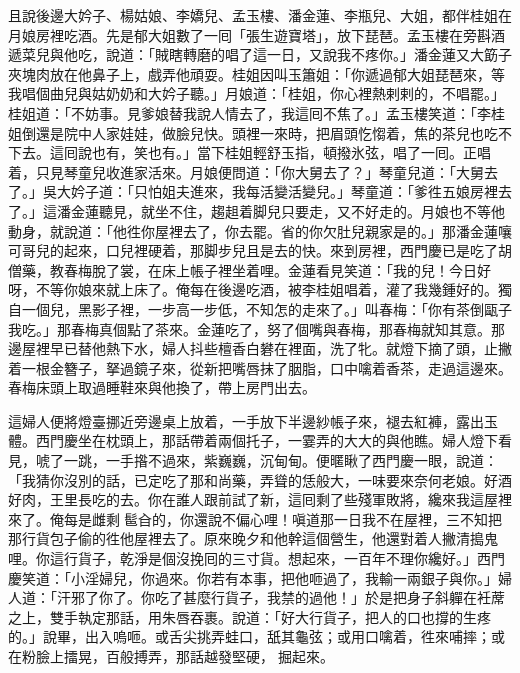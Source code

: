 且說後邊大妗子、楊姑娘、李嬌兒、孟玉樓、潘金蓮、李瓶兒、大姐，都伴桂姐在月娘房裡吃酒。先是郁大姐數了一囘「張生遊寶塔」，放下琵琶。孟玉樓在旁斟酒遞菜兒與他吃，說道：「賊瞎轉磨的唱了這一日，又說我不疼你。」潘金蓮又大筯子夾塊肉放在他鼻子上，戲弄他頑耍。桂姐因叫玉簫姐：「你遞過郁大姐琵琶來，等我唱個曲兒與姑奶奶和大妗子聽。」月娘道：「桂姐，你心裡熱剌剌的，不唱罷。」桂姐道：「不妨事。見爹娘替我說人情去了，我這囘不焦了。」孟玉樓笑道：「李桂姐倒還是院中人家娃娃，做臉兒快。頭裡一來時，把眉頭忔㥮着，焦的茶兒也吃不下去。{}這囘說也有，笑也有。」當下桂姐輕舒玉指，頓撥氷弦，唱了一囘。正唱着，只見琴童兒收進家活來。月娘便問道：「你大舅去了？」琴童兒道：「大舅去了。」吳大妗子道：「只怕姐夫進來，我每活變活變兒。」琴童道：「爹徃五娘房裡去了。」這潘金蓮聽見，就坐不住，趨趄着脚兒只要走，又不好走的。{}月娘也不等他動身，就說道：「他徃你屋裡去了，你去罷。省的你欠肚兒親家是的。」{}那潘金蓮嚷可哥兒的起來，口兒裡硬着，那脚步兒且是去的快。來到房裡，西門慶已是吃了胡僧藥，教春梅脫了裳，在床上帳子裡坐着哩。金蓮看見笑道：「我的兒！今日好呀，不等你娘來就上床了。俺每在後邊吃酒，被李桂姐唱着，灌了我幾鍾好的。獨自一個兒，黑影子裡，一步高一步低，不知怎的走來了。」{}叫春梅：「你有茶倒甌子我吃。」那春梅真個點了茶來。金蓮吃了，努了個嘴與春梅，那春梅就知其意。{}那邊屋裡早已替他熱下水，婦人抖些檀香白礬在裡面，{}洗了牝。就燈下摘了頭，止撇着一根金簪子，拏過鏡子來，從新把嘴唇抹了胭脂，口中噙着香茶，走過這邊來。春梅床頭上取過睡鞋來與他換了，帶上房門出去。

這婦人便將燈臺挪近旁邊桌上放着，一手放下半邊紗帳子來，褪去紅褲，露出玉體。西門慶坐在枕頭上，那話帶着兩個托子，一霎弄的大大的與他瞧。婦人燈下看見，唬了一跳，一手揝不過來，紫巍巍，沉甸甸。便暱瞅了西門慶一眼，說道：「我猜你沒別的話，已定吃了那和尚藥，{}弄聳的恁般大，一味要來奈何老娘。好酒好肉，王里長吃的去。你在誰人跟前試了新，這囘剩了些殘軍敗將，{}纔來我這屋裡來了。俺每是雌剩𩫻䯲㒲的，你還說不偏心哩！嗔道那一日我不在屋裡，三不知把那行貨包子偷的徃他屋裡去了。原來晚夕和他幹這個營生，他還對着人撇清搗鬼哩。你這行貨子，乾淨是個沒挽囘的三寸貨。想起來，一百年不理你纔好。」西門慶笑道：「小淫婦兒，你過來。你若有本事，把他咂過了，我輸一兩銀子與你。」婦人道：「汗邪了你了。你吃了甚麼行貨子，我禁的過他！」於是把身子斜軃在衽蓆之上，雙手執定那話，用朱唇吞裹。說道：「好大行貨子，把人的口也撐的生疼的。」說畢，出入嗚咂。或舌尖挑弄蛙口，舐其龜弦；或用口噙着，徃來哺摔；或在粉臉上擂晃，百般搏弄，那話越發堅硬，𢳥掘起來。


